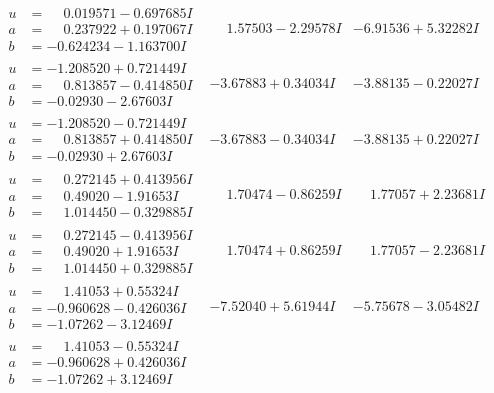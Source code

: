\documentclass[1p]{elsarticle_modified}
\theoremstyle{definition}
\begin{document}
$$\begin{array}{c|c|c}
\begin{aligned}
u &= \phantom{-}0.019571 - 0.697685 I \\
a &= \phantom{-}0.237922 + 0.197067 I \\
b &= -0.624234 - 1.163700 I\end{aligned}
 & \phantom{-}1.57503 - 2.29578 I & -6.91536 + 5.32282 I \\ \hline\begin{aligned}
u &= -1.208520 + 0.721449 I \\
a &= \phantom{-}0.813857 - 0.414850 I \\
b &= -0.02930 - 2.67603 I\end{aligned}
 & -3.67883 + 0.34034 I & -3.88135 - 0.22027 I \\ \hline\begin{aligned}
u &= -1.208520 - 0.721449 I \\
a &= \phantom{-}0.813857 + 0.414850 I \\
b &= -0.02930 + 2.67603 I\end{aligned}
 & -3.67883 - 0.34034 I & -3.88135 + 0.22027 I \\ \hline\begin{aligned}
u &= \phantom{-}0.272145 + 0.413956 I \\
a &= \phantom{-}0.49020 - 1.91653 I \\
b &= \phantom{-}1.014450 - 0.329885 I\end{aligned}
 & \phantom{-}1.70474 - 0.86259 I & \phantom{-}1.77057 + 2.23681 I \\ \hline\begin{aligned}
u &= \phantom{-}0.272145 - 0.413956 I \\
a &= \phantom{-}0.49020 + 1.91653 I \\
b &= \phantom{-}1.014450 + 0.329885 I\end{aligned}
 & \phantom{-}1.70474 + 0.86259 I & \phantom{-}1.77057 - 2.23681 I \\ \hline\begin{aligned}
u &= \phantom{-}1.41053 + 0.55324 I \\
a &= -0.960628 - 0.426036 I \\
b &= -1.07262 - 3.12469 I\end{aligned}
 & -7.52040 + 5.61944 I & -5.75678 - 3.05482 I \\ \hline\begin{aligned}
u &= \phantom{-}1.41053 - 0.55324 I \\
a &= -0.960628 + 0.426036 I \\
b &= -1.07262 + 3.12469 I\end{aligned}

\end{array}$$
\end{document}

